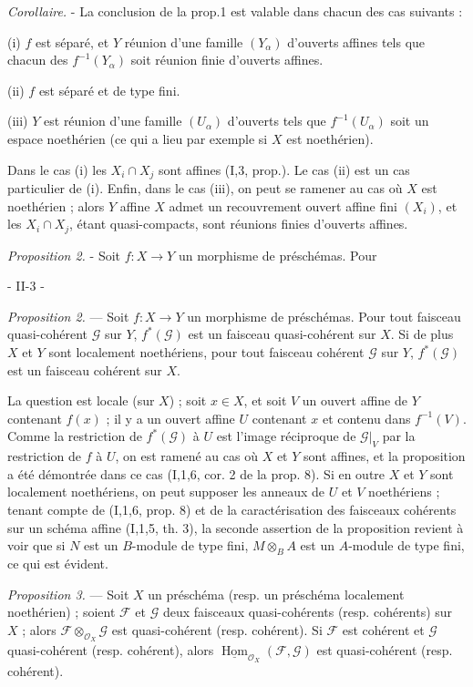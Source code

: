 \emph{Corollaire.} - La conclusion de la prop.1 est valable dans chacun des cas suivants :

(i) $f$ est séparé, et $Y$ réunion d'une famille $(Y_\alpha)$ d'ouverts affines tels que chacun des $f^{-1}(Y_\alpha)$ soit réunion finie d'ouverts affines.

(ii) $f$ est séparé et de type fini.

(iii) $Y$ est réunion d'une famille $(U_\alpha)$ d'ouverts tels que $f^{-1}(U_\alpha)$ soit un espace noethérien (ce qui a lieu par exemple si $X$ est noethérien).

Dans le cas (i) les $X_i \cap X_j$ sont affines (I,3, prop.). Le cas (ii) est un cas particulier de (i). Enfin, dans le cas (iii), on peut se ramener au cas où $X$ est noethérien ; alors $Y$ affine $X$ admet un recouvrement ouvert affine fini $(X_i)$, et les $X_i \cap X_j$, étant quasi-compacts, sont réunions finies d'ouverts affines.

\emph{Proposition 2.} - Soit $f : X \to Y$ un morphisme de préschémas. Pour

\newpage


- II-3 -

\noindent \emph{Proposition 2.} — Soit $f: X \to Y$ un morphisme de préschémas. Pour tout faisceau quasi-cohérent $\mathcal{G}$ sur $Y$, $f^*(\mathcal{G})$ est un faisceau quasi-cohérent sur $X$. Si de plus $X$ et $Y$ sont localement noethériens, pour tout faisceau cohérent $\mathcal{G}$ sur $Y$, $f^*(\mathcal{G})$ est un faisceau cohérent sur $X$.

La question est locale (sur $X$) ; soit $x \in X$, et soit $V$ un ouvert affine de $Y$ contenant $f(x)$ ; il y a un ouvert affine $U$ contenant $x$ et contenu dans $f^{-1}(V)$. Comme la restriction de $f^*(\mathcal{G})$ à $U$ est l'image réciproque de $\mathcal{G}|_V$ par la restriction de $f$ à $U$, on est ramené au cas où $X$ et $Y$ sont affines, et la proposition a été démontrée dans ce cas (I,1,6, cor. 2 de la prop. 8). Si en outre $X$ et $Y$ sont localement noethériens, on peut supposer les anneaux de $U$ et $V$ noethériens ; tenant compte de (I,1,6, prop. 8) et de la caractérisation des faisceaux cohérents sur un schéma affine (I,1,5, th. 3), la seconde assertion de la proposition revient à voir que si $N$ est un $B$-module de type fini, $M \otimes_B A$ est un $A$-module de type fini, ce qui est évident.

\noindent \emph{Proposition 3.} — Soit $X$ un préschéma (resp. un préschéma localement noethérien) ; soient $\mathcal{F}$ et $\mathcal{G}$ deux faisceaux quasi-cohérents (resp. cohérents) sur $X$ ; alors $\mathcal{F} \otimes_{\mathcal{O}_X} \mathcal{G}$ est quasi-cohérent (resp. cohérent). Si $\mathcal{F}$ est cohérent et $\mathcal{G}$ quasi-cohérent (resp. cohérent), alors $\underline{\operatorname{Hom}}_{\mathcal{O}_X}(\mathcal{F}, \mathcal{G})$ est quasi-cohérent (resp. cohérent).

